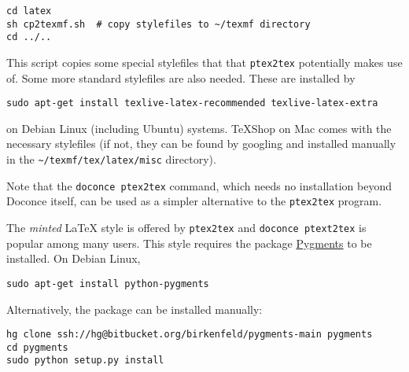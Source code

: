\documentclass[%
oneside,                 %
final,                   %
10pt]{article}
\begin{document}
\vspace{4pt}
\begin{Verbatim}[numbers=none,frame=lines,label=\fbox{{\tiny Terminal}},fontsize=\fontsize{9pt}{9pt},
labelposition=topline,framesep=2.5mm,framerule=0.7pt]
cd latex
sh cp2texmf.sh  # copy stylefiles to ~/texmf directory
cd ../..
\end{Verbatim}
This script copies some special stylefiles that
that {\fontsize{10pt}{10pt}\Verb!ptex2tex!} potentially makes use of. Some more standard stylefiles
are also needed. These are installed by

\vspace{4pt}
\begin{Verbatim}[numbers=none,frame=lines,label=\fbox{{\tiny Terminal}},fontsize=\fontsize{9pt}{9pt},
labelposition=topline,framesep=2.5mm,framerule=0.7pt]
sudo apt-get install texlive-latex-recommended texlive-latex-extra
\end{Verbatim}
on Debian Linux (including Ubuntu) systems. TeXShop on Mac comes with
the necessary stylefiles (if not, they can be found by googling and installed
manually in the {\fontsize{10pt}{10pt}\Verb!~/texmf/tex/latex/misc!} directory).

Note that the {\fontsize{10pt}{10pt}\Verb!doconce ptex2tex!} command, which needs no installation
beyond Doconce itself, can be used as a simpler alternative to the {\fontsize{10pt}{10pt}\Verb!ptex2tex!}
program.

The \emph{minted} {\LaTeX} style is offered by {\fontsize{10pt}{10pt}\Verb!ptex2tex!} and {\fontsize{10pt}{10pt}\Verb!doconce ptext2tex!}
is popular among many
users. This style requires the package \href{{http://pygments.org}}{Pygments}
to be installed. On Debian Linux,
\vspace{4pt}
\begin{Verbatim}[numbers=none,frame=lines,label=\fbox{{\tiny Terminal}},fontsize=\fontsize{9pt}{9pt},
labelposition=topline,framesep=2.5mm,framerule=0.7pt]
sudo apt-get install python-pygments
\end{Verbatim}
Alternatively, the package can be installed manually:
\vspace{4pt}
\begin{Verbatim}[numbers=none,frame=lines,label=\fbox{{\tiny Terminal}},fontsize=\fontsize{9pt}{9pt},
labelposition=topline,framesep=2.5mm,framerule=0.7pt]
hg clone ssh://hg@bitbucket.org/birkenfeld/pygments-main pygments
cd pygments
sudo python setup.py install
\end{Verbatim}
\end{document}
